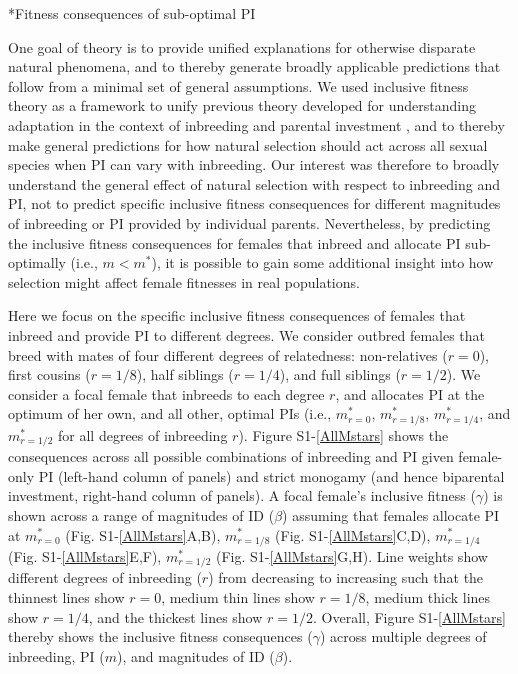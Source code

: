 \documentclass[12pt]{article}
\makeatletter
\renewcommand\section{\@startsection{section}{1}{0in}{-0.5\baselineskip}{0.1\baselineskip}{\normalfont\large\bfseries}}
\makeatother
\begin{document}
\clearpage

\section*{Fitness consequences of sub-optimal PI}

\noindent One goal of theory is to provide unified explanations for otherwise disparate natural phenomena, and to thereby generate broadly applicable predictions that follow from a minimal set of general assumptions. We used inclusive fitness theory as a framework to unify previous theory developed for understanding adaptation in the context of inbreeding \cite[e.g.,][]{Parker1979, Parker2006} and parental investment \cite[e.g.,][]{Macnair1978, Parker1978}, and to thereby make general predictions for how natural selection should act across all sexual species when PI can vary with inbreeding. Our interest was therefore to broadly understand the general effect of natural selection with respect to inbreeding and PI, not to predict specific inclusive fitness consequences for different magnitudes of inbreeding or PI provided by individual parents. Nevertheless, by predicting the inclusive fitness consequences for females that inbreed and allocate PI sub-optimally (i.e., $m < m^{*}$), it is possible to gain some additional insight into how selection might affect female fitnesses in real populations. 

Here we focus on the specific inclusive fitness consequences of females that inbreed and provide PI to different degrees. We consider outbred females that breed with mates of four different degrees of relatedness: non-relatives ($r=0$), first cousins ($r=1/8$), half siblings ($r=1/4$), and full siblings ($r=1/2$). We consider a focal female that inbreeds to each degree $r$, and allocates PI at the optimum of her own, and all other, optimal PIs (i.e., $m^{*}_{r=0}$, $m^{*}_{r=1/8}$, $m^{*}_{r=1/4}$, and $m^{*}_{r=1/2}$ for all degrees of inbreeding $r$). Figure S1-\ref{AllMstars} shows the consequences across all possible combinations of inbreeding and PI given female-only PI (left-hand column of panels) and strict monogamy (and hence biparental investment, right-hand column of panels). A focal female's inclusive fitness ($\gamma$) is shown across a range of magnitudes of ID ($\beta$) assuming that females allocate PI at $m^{*}_{r=0}$ (Fig. S1-\ref{AllMstars}A,B), $m^{*}_{r=1/8}$ (Fig. S1-\ref{AllMstars}C,D), $m^{*}_{r=1/4}$ (Fig. S1-\ref{AllMstars}E,F), $m^{*}_{r=1/2}$ (Fig. S1-\ref{AllMstars}G,H). Line weights show different degrees of inbreeding ($r$) from decreasing to increasing such that the thinnest lines show $r=0$, medium thin lines show $r=1/8$, medium thick lines show $r=1/4$, and the thickest lines show $r=1/2$. Overall, Figure S1-\ref{AllMstars} thereby shows the inclusive fitness consequences ($\gamma$) across multiple degrees of inbreeding, PI ($m$), and magnitudes of ID ($\beta$).
\end{document}
